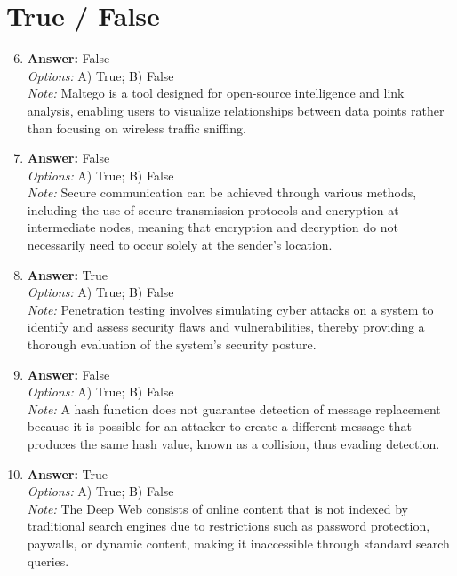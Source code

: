 \documentclass[12pt]{article}
\begin{document}
\section*{True / False}
\begin{enumerate}[label=\arabic*.]
\setcounter{enumi}{5}
\item \textbf{Answer:} False
\\ \textit{Options:} A) True; B) False
\\ \textit{Note:} Maltego is a tool designed for open-source intelligence and link analysis, enabling users to visualize relationships between data points rather than focusing on wireless traffic sniffing.
\item \textbf{Answer:} False
\\ \textit{Options:} A) True; B) False
\\ \textit{Note:} Secure communication can be achieved through various methods, including the use of secure transmission protocols and encryption at intermediate nodes, meaning that encryption and decryption do not necessarily need to occur solely at the sender's location.
\item \textbf{Answer:} True
\\ \textit{Options:} A) True; B) False
\\ \textit{Note:} Penetration testing involves simulating cyber attacks on a system to identify and assess security flaws and vulnerabilities, thereby providing a thorough evaluation of the system's security posture.
\item \textbf{Answer:} False
\\ \textit{Options:} A) True; B) False
\\ \textit{Note:} A hash function does not guarantee detection of message replacement because it is possible for an attacker to create a different message that produces the same hash value, known as a collision, thus evading detection.
\item \textbf{Answer:} True
\\ \textit{Options:} A) True; B) False
\\ \textit{Note:} The Deep Web consists of online content that is not indexed by traditional search engines due to restrictions such as password protection, paywalls, or dynamic content, making it inaccessible through standard search queries.
\end{enumerate}
\end{document}
